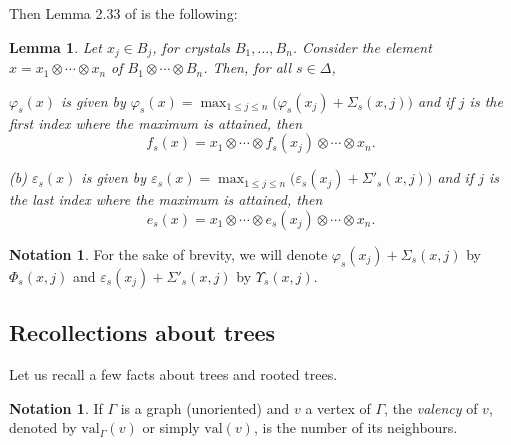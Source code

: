 \documentclass[12pt]{amsart}
\numberwithin{equation}{section}
\newtheorem{lem}[thm]{Lemma}
\theoremstyle{definition}
\newtheorem{nota}[thm]{Notation}
\def\val{\mathrm{val}} %
\let\vep\varepsilon
\begin{document}
Then Lemma 2.33 of  \cite{BS17} is the  following: 

\begin{lem}\label{lem-BS} 
Let $x_j \in B_j$, for crystals $B_1, \dots, B_n$. Consider the element $x = x_1 \otimes \cdots \otimes x_n$ of 
$B_1 \otimes \cdots \otimes B_n$. Then, for all $s\in \Delta$, 

 $\varphi_s(x)$ is given by 
$\varphi_s(x) = \max_{1\leq j\leq n} \Big( \varphi_s(x_j) + \Sigma_s(x,j) \Big)$ 
and if  $j$ is the first index where the maximum is attained, then
$$
f_s(x)
=
x_1 \otimes \cdots \otimes f_s(x_j)\otimes \cdots \otimes x_n.
$$

{\rm (b)} $\vep_s(x)$ is given by 
$\vep_s(x) = \max_{1\leq j\leq n} \Big( \vep_s(x_j) + \Sigma'_s(x,j) \Big)$
and if  $j$  is the last index where the maximum is attained, then
$$
e_s(x)
=
x_1 \otimes \cdots \otimes e_s(x_j)\otimes \cdots \otimes x_n.
$$
\end{lem} 

\begin{nota} For the sake of brevity, we will denote $\varphi_s(x_j) + \Sigma_s(x,j)$ by $\Phi_s(x,j)$ and 
$\vep_s(x_j) + \Sigma'_s(x,j)$ by $\Upsilon_s(x,j)$. 
\end{nota} 




\subsection{Recollections about trees} Let us recall a few facts about trees and rooted trees. 

\begin{nota} If $\Gamma$ is a  graph (unoriented) and $v$ a vertex of $\Gamma$, the \emph{valency}  of $v$, 
denoted by $\val_\Gamma(v)$ or simply $\val(v)$, is the number of its neighbours. 
\end{nota} 
\end{document}
